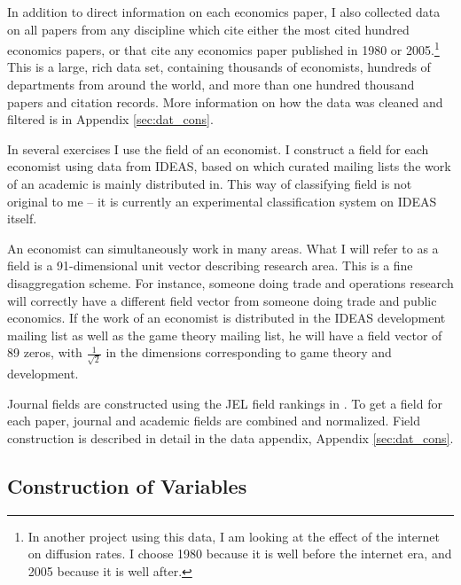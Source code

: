 \documentclass[]{article}
\begin{document}
In addition to direct information on each economics paper, I
also collected data on all papers from any discipline which cite either the
most cited hundred economics papers, or that cite any economics paper
published in 1980 or 2005.\footnote{In another project using this data, I am looking at the 
    effect of the internet on diffusion rates.  I choose 1980 because it is well before the internet era, 
and 2005 because it is well after.}  This is a large, rich data set, containing thousands
of economists, hundreds of departments from around the world, and more than 
one hundred thousand papers and citation records.  More information on how the data was cleaned and filtered is in
Appendix \ref{sec:dat_cons}. 

In several exercises I use the field of an economist. I
construct a field for each economist using data from IDEAS, based on
which curated mailing lists the work of an academic is mainly distributed in. 
This way of classifying field is not original to me -- it is currently
an experimental classification system on IDEAS itself.

An economist can simultaneously work in many areas.  What I will refer to as a 
field is a 91-dimensional unit vector describing research area. This is a 
fine disaggregation scheme.  For instance, someone doing trade and operations research
will correctly have a different field vector from someone doing trade and public economics. 
If the work of an economist is distributed in the IDEAS development 
mailing list as well as the game theory mailing list, he will
have a field vector of 89 zeros, with $\frac{1}{\sqrt{2}}$ in the
dimensions corresponding to game theory and development. 

Journal fields are constructed using the JEL field rankings in \citet{barrett2000subdiscipline}.
To get a field for each paper, journal and academic fields are combined and normalized.
Field construction is described in detail in the data appendix, Appendix \ref{sec:dat_cons}.

\subsection{Construction of Variables}
\label{sec:struct_dat}
\end{document}
